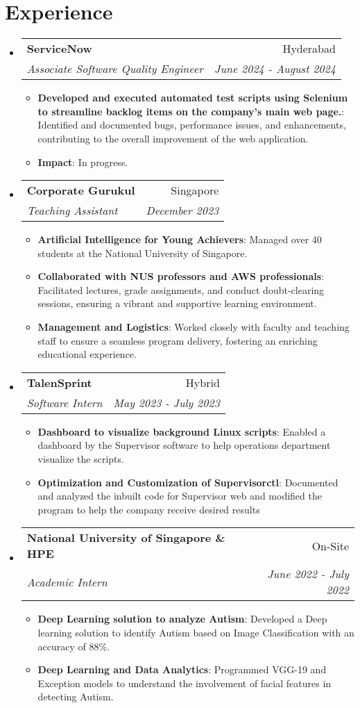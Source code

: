 \documentclass[a4paper,20pt]{article}
\makeatletter
\newcommand{\resumeItem}[2]{
  \item\small{
    \textbf{#1}{: #2 \vspace{-2pt}}
  }
}
\newcommand{\resumeSubheading}[4]{
  \vspace{-1pt}\item
    \begin{tabular*}{0.97\textwidth}{l@{\extracolsep{\fill}}r}
      \textbf{#1} & #2 \\
      \textit{#3} & \textit{#4} \\
    \end{tabular*}\vspace{-5pt}
}
\newcommand{\resumeSubHeadingListStart}{\begin{itemize}[leftmargin=*]}
\newcommand{\resumeSubHeadingListEnd}{\end{itemize}}
\newcommand{\resumeItemListStart}{\begin{itemize}}
\newcommand{\resumeItemListEnd}{\end{itemize}\vspace{-5pt}}
\makeatother
\begin{document}
\section{Experience}
  \resumeSubHeadingListStart
    \resumeSubheading
		{ServiceNow}{Hyderabad}
		{Associate Software Quality Engineer}{June 2024 -  August 2024}
		\resumeItemListStart
        \resumeItem{Developed and executed automated test scripts using Selenium to streamline backlog items on the company’s main web page.}
          {Identified and documented bugs, performance issues, and enhancements, contributing to the overall improvement of the web application.}
        \resumeItem{Impact}{In progress.}
    \resumeItemListEnd
\vspace{-2pt}
    \resumeSubheading{Corporate Gurukul}{Singapore}
    {Teaching Assistant}{December 2023}
    \resumeItemListStart
        \resumeItem{Artificial Intelligence for Young Achievers}
          {Managed over 40 students at the National University of Singapore.}
          \resumeItem{Collaborated with NUS professors and AWS professionals}
          { Facilitated lectures, grade assignments, and conduct doubt-clearing sessions, ensuring a vibrant and supportive learning environment.}
          \resumeItem{Management and Logistics}{ Worked closely with faculty and teaching staff to ensure a seamless program delivery, fostering an enriching educational experience.}
      \resumeItemListEnd
\vspace{-2pt}
    \resumeSubheading
		{TalenSprint }{Hybrid}
		{Software Intern}{May 2023 -  July 2023}
		\resumeItemListStart
        \resumeItem{Dashboard to visualize background Linux scripts}
          {Enabled a dashboard by the Supervisor software to help operations department visualize the scripts.}
        \resumeItem{Optimization and Customization of Supervisorctl}{Documented and analyzed the inbuilt code for Supervisor web and modified the program to help the company receive desired results}
		\resumeItemListEnd
\vspace{-2pt}
    \resumeSubheading
		{National University of Singapore \& HPE }{On-Site}
		{Academic Intern}{June 2022 -  July 2022}
		\resumeItemListStart
        \resumeItem{Deep Learning solution to analyze Autism}
          {Developed a Deep learning solution to identify Autism based on Image Classification with an accuracy of 88\%.}
        \resumeItem{Deep Learning and Data Analytics}{Programmed VGG-19 and Exception models to understand the involvement of facial features in detecting Autism.}
		\resumeItemListEnd
\resumeSubHeadingListEnd
\vspace{-2pt}
\end{document}
